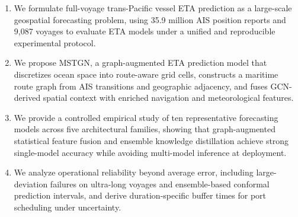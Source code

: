 \documentclass[sigconf,anonymous]{acmart}%
\begin{document}
\begin{enumerate}
    \item We formulate full-voyage trans-Pacific vessel ETA prediction as a large-scale geospatial forecasting problem, using 35.9 million AIS position reports and 9,087 voyages to evaluate ETA models under a unified and reproducible experimental protocol.

    \item We propose MSTGN, a graph-augmented ETA prediction model that discretizes ocean space into route-aware grid cells, constructs a maritime route graph from AIS transitions and geographic adjacency, and fuses GCN-derived spatial context with enriched navigation and meteorological features.

    \item We provide a controlled empirical study of ten representative forecasting models across five architectural families, showing that graph-augmented statistical feature fusion and ensemble knowledge distillation achieve strong single-model accuracy while avoiding multi-model inference at deployment.

    \item We analyze operational reliability beyond average error, including large-deviation failures on ultra-long voyages and ensemble-based conformal prediction intervals, and derive duration-specific buffer times for port scheduling under uncertainty.
\end{enumerate}
\end{document}
